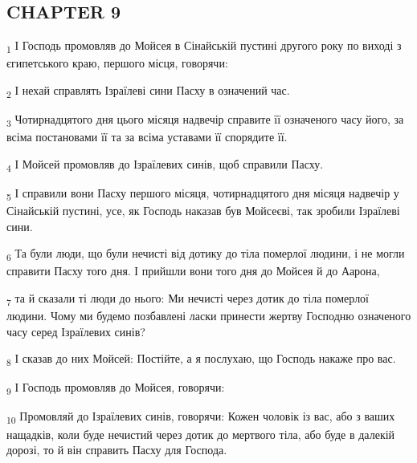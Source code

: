 \subsection{CHAPTER 9}
\begin{tcolorbox}
\textsubscript{1} І Господь промовляв до Мойсея в Сінайській пустині другого року по виході з єгипетського краю, першого місця, говорячи:
\end{tcolorbox}
\begin{tcolorbox}
\textsubscript{2} І нехай справлять Ізраїлеві сини Пасху в означений час.
\end{tcolorbox}
\begin{tcolorbox}
\textsubscript{3} Чотирнадцятого дня цього місяця надвечір справите її означеного часу його, за всіма постановами її та за всіма уставами її спорядите її.
\end{tcolorbox}
\begin{tcolorbox}
\textsubscript{4} І Мойсей промовляв до Ізраїлевих синів, щоб справили Пасху.
\end{tcolorbox}
\begin{tcolorbox}
\textsubscript{5} І справили вони Пасху першого місяця, чотирнадцятого дня місяця надвечір у Сінайській пустині, усе, як Господь наказав був Мойсеєві, так зробили Ізраїлеві сини.
\end{tcolorbox}
\begin{tcolorbox}
\textsubscript{6} Та були люди, що були нечисті від дотику до тіла померлої людини, і не могли справити Пасху того дня. І прийшли вони того дня до Мойсея й до Аарона,
\end{tcolorbox}
\begin{tcolorbox}
\textsubscript{7} та й сказали ті люди до нього: Ми нечисті через дотик до тіла померлої людини. Чому ми будемо позбавлені ласки принести жертву Господню означеного часу серед Ізраїлевих синів?
\end{tcolorbox}
\begin{tcolorbox}
\textsubscript{8} І сказав до них Мойсей: Постійте, а я послухаю, що Господь накаже про вас.
\end{tcolorbox}
\begin{tcolorbox}
\textsubscript{9} І Господь промовляв до Мойсея, говорячи:
\end{tcolorbox}
\begin{tcolorbox}
\textsubscript{10} Промовляй до Ізраїлевих синів, говорячи: Кожен чоловік із вас, або з ваших нащадків, коли буде нечистий через дотик до мертвого тіла, або буде в далекій дорозі, то й він справить Пасху для Господа.
\end{tcolorbox}
